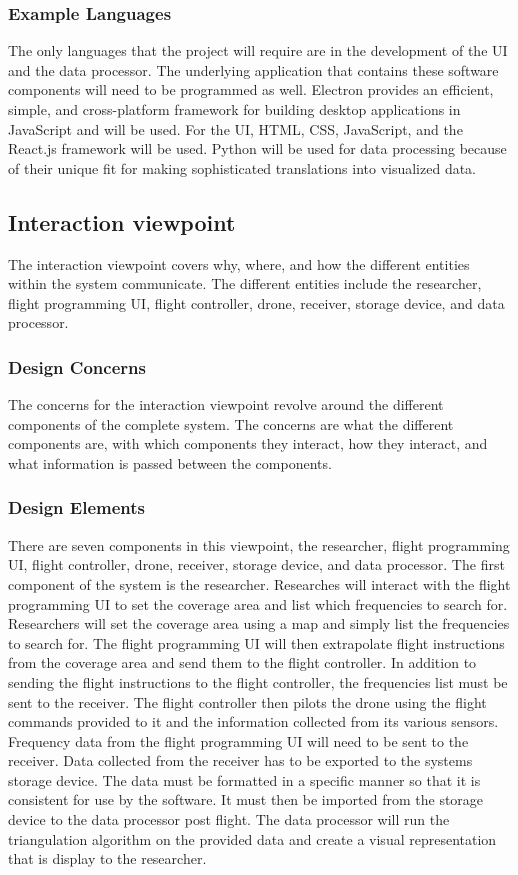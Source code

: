 \documentclass[onecolumn, draftclsnofoot,10pt, compsoc]{IEEEtran}
\begin{document}
\subsubsection{Example Languages}

The only languages that the project will require are in the development of the UI and the data processor.
The underlying application that contains these software components will need to be programmed as well.
Electron provides an efficient, simple, and cross-platform framework for building desktop applications in JavaScript and will be used.
For the UI, HTML, CSS, JavaScript, and the React.js framework will be used.
Python will be used for data processing because of their unique fit for making sophisticated translations into visualized data. 

\subsection{Interaction viewpoint}
The interaction viewpoint covers why, where, and how the different entities within the system communicate.
The different entities include the researcher, flight programming UI, flight controller, drone, receiver, storage device, and data processor.

\subsubsection{Design Concerns}
The concerns for the interaction viewpoint revolve around the different components of the complete system.
The concerns are what the different components are, with which components they interact, how they interact, and what information is passed between the components. 

\subsubsection{Design Elements}
There are seven components in this viewpoint, the researcher, flight programming UI, flight controller, drone, receiver, storage device, and data processor.
The first component of the system is the researcher. Researches will interact with the flight programming UI to set the coverage area and list which frequencies to search for.
Researchers will set the coverage area using a map and simply list the frequencies to search for.
The flight programming UI will then extrapolate flight instructions from the coverage area and send them to the flight controller.
In addition to sending the flight instructions to the flight controller, the frequencies list must be sent to the receiver.
The flight controller then pilots the drone using the flight commands provided to it and the information collected from its various sensors.
Frequency data from the flight programming UI will need to be sent to the receiver.
Data collected from the receiver has to be exported to the systems storage device.
The data must be formatted in a specific manner so that it is consistent for use by the software.
It must then be imported from the storage device to the data processor post flight.
The data processor will run the triangulation algorithm on the provided data and create a visual representation that is display to the researcher.
\end{document}
